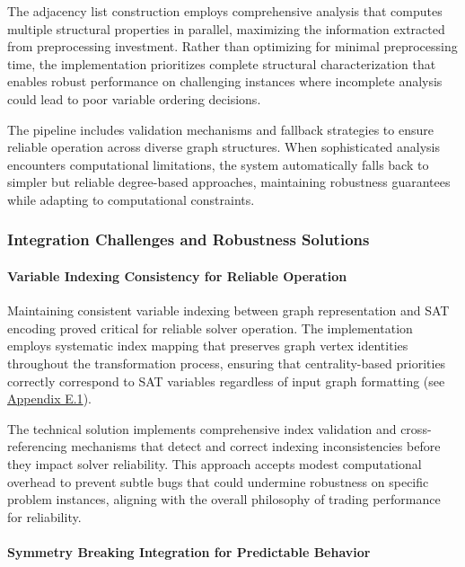 The adjacency list construction employs comprehensive analysis that computes multiple structural properties in parallel, maximizing the information extracted from preprocessing investment. Rather than optimizing for minimal preprocessing time, the implementation prioritizes complete structural characterization that enables robust performance on challenging instances where incomplete analysis could lead to poor variable ordering decisions.

The pipeline includes validation mechanisms and fallback strategies to ensure reliable operation across diverse graph structures. When sophisticated analysis encounters computational limitations, the system automatically falls back to simpler but reliable degree-based approaches, maintaining robustness guarantees while adapting to computational constraints.

\subsubsection{Integration Challenges and Robustness Solutions}

\paragraph{Variable Indexing Consistency for Reliable Operation}

Maintaining consistent variable indexing between graph representation and SAT encoding proved critical for reliable solver operation. The implementation employs systematic index mapping that preserves graph vertex identities throughout the transformation process, ensuring that centrality-based priorities correctly correspond to SAT variables regardless of input graph formatting (see \hyperref[appendix:variable-indexing]{Appendix E.1}).

The technical solution implements comprehensive index validation and cross-referencing mechanisms that detect and correct indexing inconsistencies before they impact solver reliability. This approach accepts modest computational overhead to prevent subtle bugs that could undermine robustness on specific problem instances, aligning with the overall philosophy of trading performance for reliability.

\paragraph{Symmetry Breaking Integration for Predictable Behavior}

